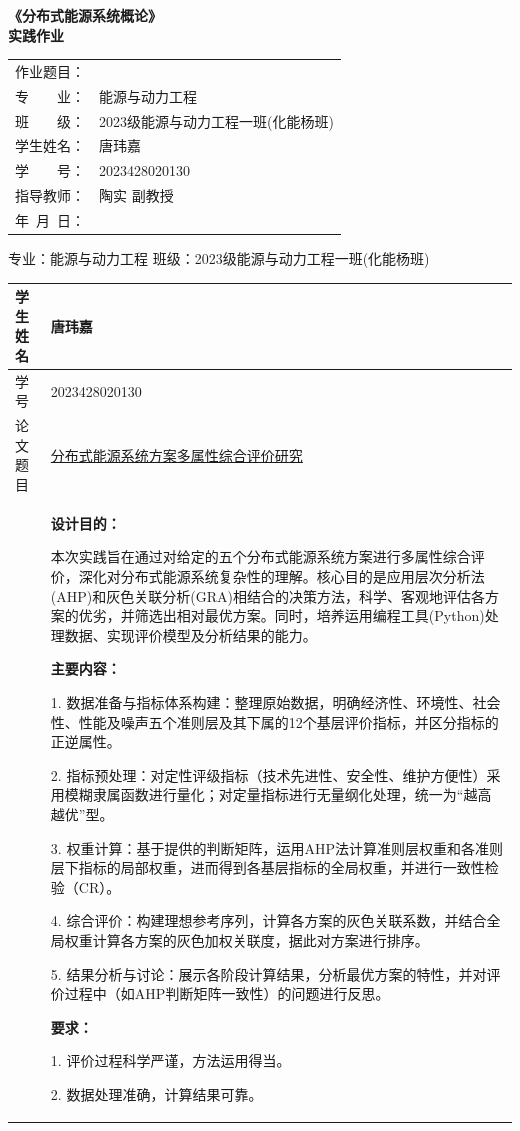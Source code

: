 \documentclass[12pt]{ctexart}
\newcommand{\cover}[6]{
  \begin{center}
    {\LARGE \bfseries 《分布式能源系统概论》}\\[1em]
    {\Large \bfseries 实践作业}\\[2em] %
    
    \begin{tabular}{>{\raggedright}p{3cm}l} %
      作业题目： & \underline{\makebox[8cm][s]{#1}} \\
      专~~~~业： & 能源与动力工程 \\
      班~~~~级： & 2023级能源与动力工程一班(化能杨班) \\
      学生姓名： & 唐玮嘉 \\
      学~~~~号： & 2023428020130 \\
      指导教师： & 陶实 副教授 \\
      年~月~日： & \underline{\makebox[4cm][s]{#2}} \\
    \end{tabular}
  \end{center}
  \vspace{2em}
}
\begin{document}
\cover{分布式能源系统方案多属性综合评价研究}{\today}

\newpage
\section*{课程论文任务书}
专业：能源与动力工程 \quad 班级：2023级能源与动力工程一班(化能杨班)

\begin{tabularx}{\textwidth}{|>{\raggedright\arraybackslash}p{3cm}|X|} %
  \hline
  学生姓名 & 唐玮嘉 \\
  \hline
  学号 & 2023428020130 \\
  \hline
  论文题目 & \underline{分布式能源系统方案多属性综合评价研究} \\
  \hline
  \multirow{3}{=}{\centering\arraybackslash 设计目的、主要内容及要求} 
    & 
      \textbf{设计目的：} \par
      本次实践旨在通过对给定的五个分布式能源系统方案进行多属性综合评价，深化对分布式能源系统复杂性的理解。核心目的是应用层次分析法(AHP)和灰色关联分析(GRA)相结合的决策方法，科学、客观地评估各方案的优劣，并筛选出相对最优方案。同时，培养运用编程工具(Python)处理数据、实现评价模型及分析结果的能力。
      \par \vspace{0.5em}
      \textbf{主要内容：} \par
      1. 数据准备与指标体系构建：整理原始数据，明确经济性、环境性、社会性、性能及噪声五个准则层及其下属的12个基层评价指标，并区分指标的正逆属性。 \par
      2. 指标预处理：对定性评级指标（技术先进性、安全性、维护方便性）采用模糊隶属函数进行量化；对定量指标进行无量纲化处理，统一为“越高越优”型。 \par
      3. 权重计算：基于提供的判断矩阵，运用AHP法计算准则层权重和各准则层下指标的局部权重，进而得到各基层指标的全局权重，并进行一致性检验（CR）。 \par
      4. 综合评价：构建理想参考序列，计算各方案的灰色关联系数，并结合全局权重计算各方案的灰色加权关联度，据此对方案进行排序。 \par
      5. 结果分析与讨论：展示各阶段计算结果，分析最优方案的特性，并对评价过程中（如AHP判断矩阵一致性）的问题进行反思。
      \par \vspace{0.5em}
      \textbf{要求：} \par
      1. 评价过程科学严谨，方法运用得当。 \par
      2. 数据处理准确，计算结果可靠。 \par

\end{tabularx}
\end{document}
